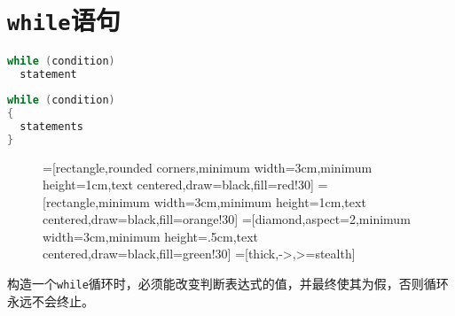 \section{\lstinline|while|语句}

\begin{frame}[fragile]\ft{\secname}
\begin{lstlisting}[language=c,backgroundcolor=\color{red!10}]
while (condition)
  statement
\end{lstlisting}
\begin{lstlisting}[language=c,backgroundcolor=\color{red!10}]
while (condition)
{
  statements
}
\end{lstlisting}
\end{frame}

\begin{frame}[fragile]\ft{\secname}
\begin{figure}
\centering
{}=[rectangle,rounded corners,minimum width=3cm,minimum height=1cm,text centered,draw=black,fill=red!30]
=[rectangle,minimum width=3cm,minimum height=1cm,text centered,draw=black,fill=orange!30]
=[diamond,aspect=2,minimum width=3cm,minimum height=.5cm,text centered,draw=black,fill=green!30]
=[thick,->,>=stealth]


\end{figure}

\end{frame}

\begin{frame}[fragile]
构造一个\lstinline|while|循环时，必须能改变判断表达式的值，并最终使其为假，否则循环永远不会终止。
\end{frame}

